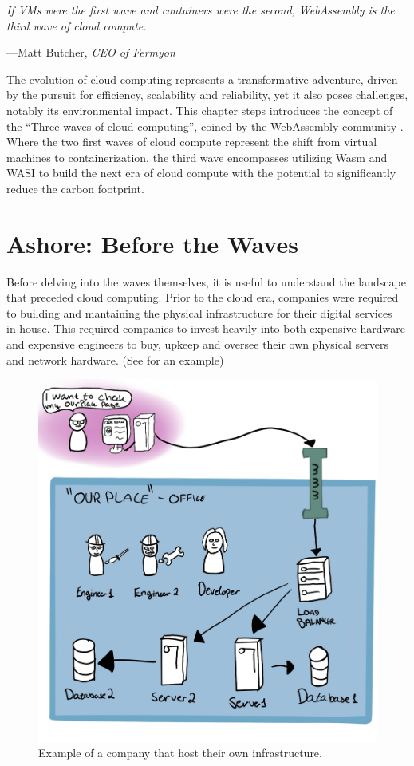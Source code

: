 \documentclass[
  table]{report}
\begin{document}
\setlength{}

\epigraph{\itshape 
If VMs were the first wave and containers were the second, WebAssembly is the third wave of cloud compute.
}{---Matt Butcher, \textit{CEO of Fermyon}}

The evolution of cloud computing represents a transformative adventure,
driven by the pursuit for efficiency, scalability and reliability, yet
it also poses challenges, notably its environmental impact. This chapter
steps introduces the concept of the ``Three waves of cloud computing'',
coined by the WebAssembly community
\citep*{butcherDodds2024, leonardWebAssemblyHeraldsThird2024}. Where the
two first waves of cloud compute represent the shift from virtual
machines to containerization, the third wave encompasses utilizing
\ac{Wasm} and \ac{WASI} to build the next era of cloud compute with the
potential to significantly reduce the carbon footprint.

\section{Ashore: Before the Waves}
\label{sect:ashore}

Before delving into the waves themselves, it is useful to understand the
landscape that preceded cloud computing. Prior to the cloud era,
companies were required to building and mantaining the physical
infrastructure for their digital services in-house. This required
companies to invest heavily into both expensive hardware and expensive
engineers to buy, upkeep and oversee their own physical servers and
network hardware. (See  for an example)

\begin{figure}[H]
\centering
  \includegraphics[width=0.7\columnwidth]{assets/pre-wave.jpg}
  \caption{Example of a company that host their own infrastructure.}
  \label{fig:myspeis}
\end{figure}
\end{document}
